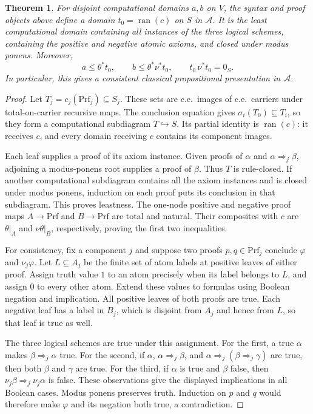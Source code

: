 \documentclass[11pt]{article}
\newtheorem{theorem}{Theorem}[section]
\newcommand{\ran}{\operatorname{ran}}
\begin{document}
\begin{theorem}\label{thm:fork-proof-presentation}
For disjoint computational domains $a,b$ on $V$, the syntax and
proof objects above define a domain $t_0=\ran(c)$ on $S$ in
$\mathcal A$. It is the least computational domain containing
all instances of the three logical schemes, containing the
positive and negative atomic axioms, and closed under modus ponens.
Moreover,
\[
 a\le\theta^*t_0,\qquad
 b\le\theta^*\nu^*t_0,\qquad
 t_0\,\nu^*t_0=0_S.
\]
In particular, this gives a consistent classical propositional
presentation in $\mathcal A$.
\end{theorem}
\begin{proof}
Let $T_j=c_j(\mathrm{Prf}_j)\subseteq S_j$.
These sets are c.e.\ images of c.e.\ carriers under
total-on-carrier recursive maps. The conclusion equation gives
$\sigma_i(T_0)\subseteq T_i$, so they form a computational
subdiagram $T\hookrightarrow S$. Its partial identity is
$\ran(c)$: it receives $c$, and every domain receiving $c$
contains its component images.

Each leaf supplies a proof of its axiom instance. Given proofs
of $\alpha$ and $\alpha\Rightarrow_j\beta$, adjoining a
modus-ponens root supplies a proof of $\beta$. Thus $T$ is
rule-closed. If another computational subdiagram contains all
the axiom instances and is closed under modus ponens, induction
on each proof puts its conclusion in that subdiagram. This
proves leastness. The one-node positive and negative proof maps
$A\to\mathrm{Prf}$ and $B\to\mathrm{Prf}$ are total and natural.
Their composites with $c$ are $\theta|_A$ and
$\nu\theta|_B$, respectively, proving the first two inequalities.

For consistency, fix a component $j$ and suppose two proofs
$p,q\in\mathrm{Prf}_j$ conclude $\varphi$ and $\nu_j\varphi$.
Let $L\subseteq A_j$ be the finite set of atom labels at
positive leaves of either proof. Assign truth value $1$ to an
atom precisely when its label belongs to $L$, and assign $0$
to every other atom. Extend these values to formulas using
Boolean negation and implication.
All positive leaves of both proofs are true. Each negative
leaf has a label in $B_j$, which is disjoint from $A_j$ and
hence from $L$, so that leaf is true as well.

The three logical schemes are true under this assignment.
For the first, a true $\alpha$ makes
$\beta\Rightarrow_j\alpha$ true. For the second, if
$\alpha$, $\alpha\Rightarrow_j\beta$, and
$\alpha\Rightarrow_j(\beta\Rightarrow_j\gamma)$ are true,
then both $\beta$ and $\gamma$ are true. For the third, if
$\alpha$ is true and $\beta$ false, then
$\nu_j\beta\Rightarrow_j\nu_j\alpha$ is false.
These observations give the displayed implications in all
Boolean cases. Modus ponens preserves truth. Induction on
$p$ and $q$ would therefore make $\varphi$ and its negation
both true, a contradiction.


\end{proof}
\end{document}
